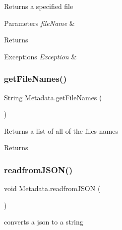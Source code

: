 Returns a specified file 
\begin{DoxyParams}{Parameters}
{\em file\+Name} & \\
\hline
\end{DoxyParams}
\begin{DoxyReturn}{Returns}

\end{DoxyReturn}

\begin{DoxyExceptions}{Exceptions}
{\em Exception} & \\
\hline
\end{DoxyExceptions}
\mbox{\label{class_metadata_a47932985a21ca5fe3e99726b50c36658}} 
\subsubsection{\texorpdfstring{get\+File\+Names()}{getFileNames()}}
{\footnotesize\ttfamily String Metadata.\+get\+File\+Names (\begin{DoxyParamCaption}{ }\end{DoxyParamCaption})\hspace{0.3cm}{\ttfamily [inline]}}

Returns a list of all of the file\textquotesingle{}s names \begin{DoxyReturn}{Returns}

\end{DoxyReturn}
\mbox{\label{class_metadata_ab22a1ff2f8390792d6c520be50dd3906}} 
\subsubsection{\texorpdfstring{readfrom\+J\+S\+O\+N()}{readfromJSON()}}
{\footnotesize\ttfamily void Metadata.\+readfrom\+J\+S\+ON (\begin{DoxyParamCaption}{ }\end{DoxyParamCaption})\hspace{0.3cm}{\ttfamily [inline]}}

converts a json to a string \mbox{\label{class_metadata_ad553fd3bd0610354c55d603c64886533}} 

